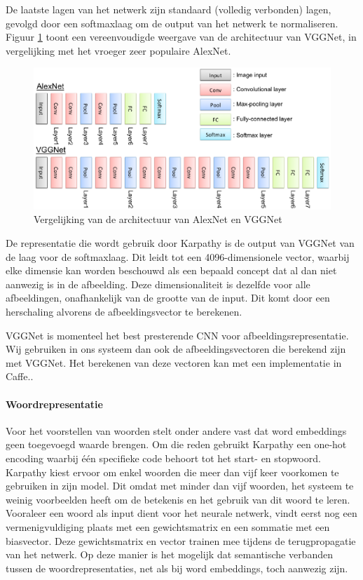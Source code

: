 De laatste lagen van het netwerk zijn standaard (volledig verbonden) lagen, gevolgd door een softmaxlaag om de output van het netwerk te normaliseren. Figuur \ref{fig:alexvgg} toont een vereenvoudigde weergave van de architectuur van VGGNet, in vergelijking met het vroeger zeer populaire AlexNet\cite{Krizhevsky2012a}.

\begin{figure}[tb]
    \centering
    \includegraphics[width=\linewidth]{Images/alex_vgg.eps}
    \caption{Vergelijking van de architectuur van AlexNet en VGGNet}
    \label{fig:alexvgg}
\end{figure}


De representatie die wordt gebruik door Karpathy is de output van VGGNet van de laag voor de softmaxlaag. Dit leidt tot een 4096-dimensionele vector, waarbij elke dimensie kan worden beschouwd als een bepaald concept dat al dan niet aanwezig is in de afbeelding. Deze dimensionaliteit is dezelfde voor alle afbeeldingen, onafhankelijk van de grootte van de input. Dit komt door een herschaling alvorens de afbeeldingsvector te berekenen.

VGGNet is momenteel het best presterende CNN voor afbeeldingsrepresentatie. Wij gebruiken in ons systeem dan ook de afbeeldingsvectoren die berekend zijn met VGGNet. Het berekenen van deze vectoren kan met een implementatie in Caffe.\cite{Jia2014}.

\paragraph{Woordrepresentatie}
Voor het voorstellen van woorden stelt onder andere  vast dat word embeddings geen toegevoegd waarde brengen. Om die reden gebruikt Karpathy een one-hot encoding waarbij \'e\'en specifieke code behoort tot het start- en stopwoord. Karpathy kiest ervoor om enkel woorden die meer dan vijf keer voorkomen te gebruiken in zijn model. Dit omdat met minder dan vijf woorden, het systeem te weinig voorbeelden heeft om de betekenis en het gebruik van dit woord te leren. Vooraleer een woord als input dient voor het neurale netwerk, vindt eerst nog een vermenigvuldiging plaats met een gewichtsmatrix en een sommatie met een biasvector. Deze gewichtsmatrix en vector trainen mee tijdens de terugpropagatie van het netwerk. Op deze manier is het mogelijk dat semantische verbanden tussen de woordrepresentaties, net als bij word embeddings, toch aanwezig zijn.

